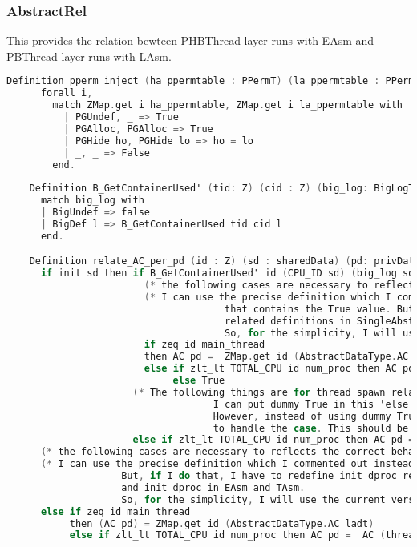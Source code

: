 

\subsubsection{AbstractRel}

This provides the relation bewteen PHBThread layer runs with EAsm and PBThread layer runs with LAsm. 

\begin{lstlisting}[language=C]
    Definition pperm_inject (ha_ppermtable : PPermT) (la_ppermtable : PPermT) : Prop := 
      forall i, 
        match ZMap.get i ha_ppermtable, ZMap.get i la_ppermtable with 
          | PGUndef, _ => True
          | PGAlloc, PGAlloc => True 
          | PGHide ho, PGHide lo => ho = lo
          | _, _ => False
        end.
    
    Definition B_GetContainerUsed' (tid: Z) (cid : Z) (big_log: BigLogType) : bool :=
      match big_log with 
      | BigUndef => false
      | BigDef l => B_GetContainerUsed tid cid l
      end.

    Definition relate_AC_per_pd (id : Z) (sd : sharedData) (pd: privData) (ladt : AbstractDataType.RData) :=
      if init sd then if B_GetContainerUsed' id (CPU_ID sd) (big_log sd) then 
                        (* the following cases are necessary to reflects the correct behaviour of the initialization *)
                        (* I can use the precise definition which I commented out instead of the version 
                                      that contains the True value. But, if I do that, I have to redefine init_dproc
                                      related definitions in SingleAbstractDataType and init_dproc in EAsm and TAsm.
                                      So, for the simplicity, I will use the current version *)
                        if zeq id main_thread 
                        then AC pd =  ZMap.get id (AbstractDataType.AC ladt)
                        else if zlt_lt TOTAL_CPU id num_proc then AC pd = ZMap.get id (AbstractDataType.AC ladt) 
                             else True
                      (* The following things are for thread spawn related_RData.
                                    I can put dummy True in this 'else' case, and prove the case for thread_spawn. 
                                    However, instead of using dummy True, I decided to add the precise value 
                                    to handle the case. This should be much better then the dummy True *)
                      else if zlt_lt TOTAL_CPU id num_proc then AC pd = AC (thread_init_dproc id) else True
      (* the following cases are necessary to reflects the correct behaviour of the initialization *)
      (* I can use the precise definition which I commented out instead of the version that contains the True value.
                    But, if I do that, I have to redefine init_dproc related definitions in SingleAbstractDataType 
                    and init_dproc in EAsm and TAsm.
                    So, for the simplicity, I will use the current version *)
      else if zeq id main_thread 
           then (AC pd) = ZMap.get id (AbstractDataType.AC ladt) 
           else if zlt_lt TOTAL_CPU id num_proc then AC pd =  AC (thread_init_dproc id) else True.


\end{lstlisting}
